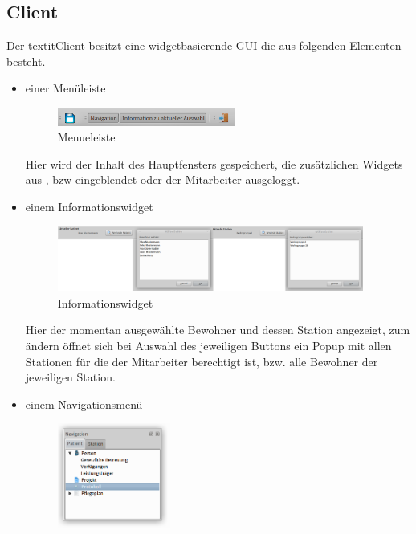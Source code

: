 \subsection{\EBP Client}
Der \EBP textit{Client} besitzt eine widgetbasierende GUI die aus folgenden Elementen besteht.
\begin{itemize}
	\item einer Menüleiste
	\begin{figure}[h]
		\begin{center}
			\includegraphics[keepaspectratio=true, width=0.55\textwidth]{pics/client_header.png}
			\caption{Menueleiste}
			\label{Menüleiste, fixiert an der oberen Seite des Programms}
		\end{center}
	\end{figure}
	\FloatBarrier
	\noindent
	Hier wird der Inhalt des Hauptfensters gespeichert, die zusätzlichen Widgets aus-, bzw eingeblendet oder der Mitarbeiter ausgeloggt.
	\item einem Informationswidget
	\begin{figure}[h]
		\begin{center}
			\includegraphics[keepaspectratio=true, width=0.95\textwidth]{pics/client_info.png}
			\caption{Informationswidget}
			\label{Bewohner- und Stationswidget}
		\end{center}
	\end{figure}
	\FloatBarrier
	\noindent
	Hier der momentan ausgewählte Bewohner und dessen Station angezeigt, zum ändern öffnet sich bei Auswahl des jeweiligen Buttons ein Popup mit allen Stationen für die der Mitarbeiter berechtigt ist, bzw. alle Bewohner der jeweiligen Station.
	\newpage
	\item einem Navigationsmenü
	\begin{figure}[h]
		\begin{center}
			\includegraphics[keepaspectratio=true, width=0.35\textwidth]{pics/client_navi.png}

\end{center}
\end{figure}
\end{itemize}
